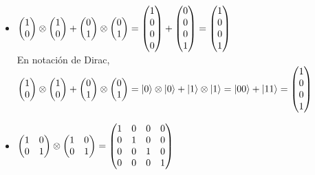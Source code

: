\documentclass[osajnl,preprint,showpacs,superscriptaddress,10pt]{revtex4-1} %
\DeclarePairedDelimiter\ket{\lvert}{\rangle}
\begin{document}
\begin{itemize}
    \item $\begin{pmatrix}1 \\ 0\end{pmatrix} \tens \begin{pmatrix}1 \\ 0\end{pmatrix} + \begin{pmatrix}0 \\ 1\end{pmatrix} \tens \begin{pmatrix}0 \\ 1\end{pmatrix} = \begin{pmatrix}1 \\ 0 \\ 0 \\ 0\end{pmatrix} + \begin{pmatrix}0 \\ 0 \\ 0 \\ 1\end{pmatrix} = \begin{pmatrix}1 \\ 0 \\ 0 \\ 1\end{pmatrix}$ \\
    
    En notación de Dirac, $\begin{pmatrix}1 \\ 0\end{pmatrix} \tens \begin{pmatrix}1 \\ 0\end{pmatrix} + \begin{pmatrix}0 \\ 1\end{pmatrix} \tens \begin{pmatrix}0 \\ 1\end{pmatrix} = \ket{0} \tens \ket{0} + \ket{1} \tens \ket{1} = \ket{00} + \ket{11} = \begin{pmatrix}1 \\ 0 \\ 0 \\ 1\end{pmatrix}$
    
    \item $\begin{pmatrix}
        1 & 0 \\
        0 & 1
    \end{pmatrix}
    \tens 
    \begin{pmatrix}
        1  & 0 \\
        0 & 1
    \end{pmatrix} =
    \begin{pmatrix}
        1 & 0 & 0 & 0 \\
        0 & 1 & 0 & 0 \\
        0 & 0 & 1 & 0 \\
        0 & 0 & 0 & 1
    \end{pmatrix}$
    

\end{itemize}
\end{document}
